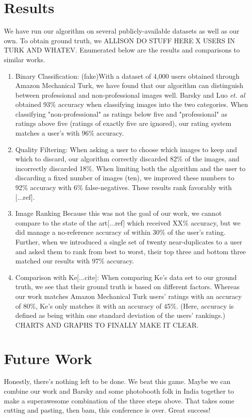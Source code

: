 \documentclass[twocolumn]{article}
\begin{document}
\section{Results}
We have run our algorithm on several publicly-available datasets as well as our own. To obtain ground truth, we ALLISON DO STUFF HERE X USERS IN TURK AND WHATEV.
Enumerated below are the results and comparisons to similar works.
\begin{enumerate}
\item Binary Classification: (fake)With a dataset of 4,000 users obtained through Amazon Mechanical Turk, we have found that our algorithm can distinguish between professional and non-professional images well. Barsky \cite{Yeh:2010:PPR:1873951.1873963} and Luo \emph{et. al}\cite{springerlink:10.1007/978-3-540-88690-7_29} obtained 93\% accuracy when classifying images into the two categories. When classifying "non-professional" as ratings below five and "professional" as ratings above five (ratings of exactly five are ignored), our rating system matches a user's with 96\% accuracy.
\item Quality Filtering: When asking a user to choose which images to keep and which to discard, our algorithm correctly discarded 82\% of the images, and incorrectly discarded 18\%. When limiting both the algorithm and the user to discarding a fixed number of images (ten), we improved these numbers to 92\% accuracy with 6\% false-negatives. These results rank favorably with [...ref].
\item Image Ranking Because this was not the goal of our work, we cannot compare to the state of the art[...ref] which received XX\% accuracy, but we did manage a no-reference accuracy of within 30\% of the user's rating. Further, when we introduced a single set of twenty near-duplicates to a user and asked them to rank from best to worst, their top three and bottom three matched our results with 97\% accuracy.
\item Comparison with Ke[...cite]: When comparing Ke's data set to our ground truth, we see that their ground truth is based on different factors. Whereas our work matches Amazon Mechanical Turk users' ratings with an accuracy of 80\%, Ke's only matches it with an accuracy of 45\%. (Here, accuracy is defined as being within one standard deviation of the users' rankings.) CHARTS AND GRAPHS TO FINALLY MAKE IT CLEAR.
\end{enumerate}

\section{Future Work}
Honestly, there's nothing left to be done. We beat this game. Maybe we can combine our work and Barsky and some photobooth folk in India together to make a superawesome combination of the three steps above. That takes some cutting and pasting, then bam, this conference is over. Great success!



\end{document}
